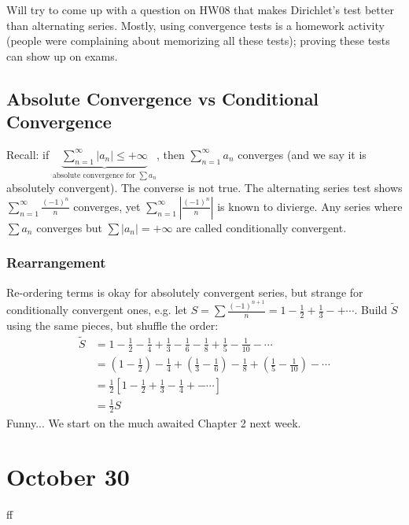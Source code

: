 \documentclass{article}
\theoremstyle{plain}
\theoremstyle{remark}
\begin{document}
Will try to come up with a question on HW08 that makes Dirichlet's
test better than alternating series.
Mostly, using convergence tests is a homework activity
(people were complaining about memorizing all these tests);
proving these tests can show up on exams.

\subsection{Absolute Convergence vs Conditional Convergence}
Recall: if $\underbrace{\sum_{n=1}^\infty |a_n| \leq +\infty}_{
\text{absolute convergence for }\sum a_n}$,
then $\sum_{n=1}^\infty a_n$ converges
(and we say it is absolutely convergent).
The converse is not true.
The alternating series test shows $\sum_{n=1}^\infty \frac{(-1)^n}{n}$ converges,
yet $\sum_{n=1}^\infty \left\lvert\frac{(-1)^n}{n}\right\rvert$
is known to divierge.
Any series where $\sum a_n$ converges but $\sum|a_n| = +\infty$
are called conditionally convergent.

\subsubsection{Rearrangement}
Re-ordering terms is okay for absolutely convergent series,
but strange for conditionally convergent ones, e.g.
let $S = \sum\frac{(-1)^{n+1}}{n} = 1 - \frac{1}{2} + \frac{1}{3} -+ \cdots$.
Build $\tilde{S}$ using the same pieces, but shuffle the order:
\begin{align*}
	\tilde{S}
	&= 1 - \frac{1}{2} - \frac{1}{4} + \frac{1}{3} - \frac{1}{6}
	-\frac{1}{8} + \frac{1}{5}-\frac{1}{10} - \cdots\\
	&= \left(1 - \frac{1}{2}\right) - \frac{1}{4} + \left(\frac{1}{3} - \frac{1}{6}\right)
	-\frac{1}{8} + \left(\frac{1}{5}-\frac{1}{10}\right) - \cdots\\
	&= \frac12\left[1 - \frac{1}{2} + \frac{1}{3} - \frac{1}{4} +- \cdots\right]\\
	&= \frac{1}{2}S
\end{align*}
Funny...
\newline We start on the much awaited Chapter 2 next week.

\section{October 30}
ff
\end{document}
